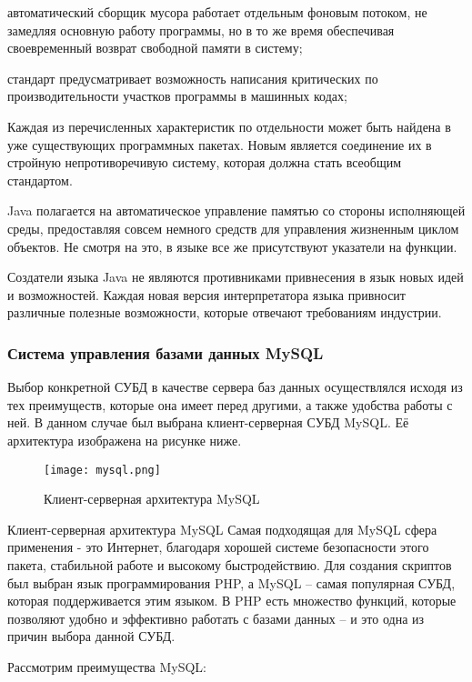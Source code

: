 автоматический сборщик мусора работает отдельным фоновым потоком, не замедляя основную работу программы, но в то же время обеспечивая своевременный возврат свободной памяти в систему;

стандарт предусматривает возможность написания критических по производительности участков программы в машинных кодах;

Каждая из перечисленных характеристик по отдельности может быть найдена в уже существующих программных пакетах. Новым является соединение их в стройную непротиворечивую систему, которая должна стать всеобщим стандартом.

Java полагается на автоматическое управление памятью со стороны исполняющей среды, предоставляя совсем немного средств для управления жизненным циклом объектов.
Не смотря на это, в языке все же присутствуют указатели на функции.

Создатели языка Java не являются противниками привнесения в язык новых идей и возможностей.
Каждая новая версия интерпретатора языка привносит различные полезные возможности, которые отвечают требованиям индустрии.


\subsubsection{Система управления базами данных MySQL}
\label{sub:practice:vhdl_overview}
Выбор конкретной СУБД в качестве сервера баз данных осуществлялся исходя из тех преимуществ, которые она имеет перед другими, а также удобства работы с ней. В данном случае был выбрана клиент-серверная СУБД MySQL. Её архитектура изображена на рисунке ниже. 

\begin{figure}[!htb]
	\centering
	\texttt{[image: mysql.png]}
	\caption{ Клиент-серверная архитектура MySQL}
	\label{fig:arch_and_mod::lexer_flow}
	\clearpage
\end{figure}

Клиент-серверная архитектура MySQL
Самая подходящая для MySQL сфера применения - это Интернет, благодаря хорошей системе безопасности этого пакета, стабильной работе и высокому быстродействию. Для создания скриптов был выбран язык программирования PHP, а MySQL – самая популярная СУБД, которая поддерживается этим языком. В PHP есть множество функций, которые позволяют удобно и эффективно работать с базами данных – и это одна из причин выбора данной СУБД.

Рассмотрим преимущества MySQL:

